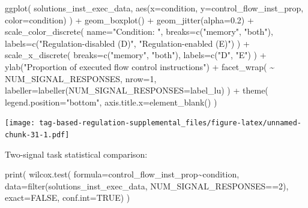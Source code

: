 \documentclass[
]{book}
\newenvironment{Shaded}{\begin{snugshade}}{\end{snugshade}}
\newcommand{\AttributeTok}[1]{\textcolor[rgb]{0.77,0.63,0.00}{#1}}
\newcommand{\ConstantTok}[1]{\textcolor[rgb]{0.00,0.00,0.00}{#1}}
\newcommand{\DecValTok}[1]{\textcolor[rgb]{0.00,0.00,0.81}{#1}}
\newcommand{\FloatTok}[1]{\textcolor[rgb]{0.00,0.00,0.81}{#1}}
\newcommand{\FunctionTok}[1]{\textcolor[rgb]{0.00,0.00,0.00}{#1}}
\newcommand{\NormalTok}[1]{#1}
\newcommand{\SpecialCharTok}[1]{\textcolor[rgb]{0.00,0.00,0.00}{#1}}
\newcommand{\StringTok}[1]{\textcolor[rgb]{0.31,0.60,0.02}{#1}}
\begin{document}
\begin{Shaded}
\begin{Highlighting}[]
\FunctionTok{ggplot}\NormalTok{( solutions\_inst\_exec\_data, }\FunctionTok{aes}\NormalTok{(}\AttributeTok{x=}\NormalTok{condition, }\AttributeTok{y=}\NormalTok{control\_flow\_inst\_prop, }\AttributeTok{color=}\NormalTok{condition) ) }\SpecialCharTok{+}
  \FunctionTok{geom\_boxplot}\NormalTok{() }\SpecialCharTok{+}
  \FunctionTok{geom\_jitter}\NormalTok{(}\AttributeTok{alpha=}\FloatTok{0.2}\NormalTok{) }\SpecialCharTok{+}
  \FunctionTok{scale\_color\_discrete}\NormalTok{(}
    \AttributeTok{name=}\StringTok{"Condition: "}\NormalTok{,}
    \AttributeTok{breaks=}\FunctionTok{c}\NormalTok{(}\StringTok{"memory"}\NormalTok{, }\StringTok{"both"}\NormalTok{),}
    \AttributeTok{labels=}\FunctionTok{c}\NormalTok{(}\StringTok{"Regulation{-}disabled (D)"}\NormalTok{, }\StringTok{"Regulation{-}enabled (E)"}\NormalTok{)}
\NormalTok{  ) }\SpecialCharTok{+}
  \FunctionTok{scale\_x\_discrete}\NormalTok{(}
    \AttributeTok{breaks=}\FunctionTok{c}\NormalTok{(}\StringTok{"memory"}\NormalTok{, }\StringTok{"both"}\NormalTok{),}
    \AttributeTok{labels=}\FunctionTok{c}\NormalTok{(}\StringTok{"D"}\NormalTok{, }\StringTok{"E"}\NormalTok{)}
\NormalTok{  ) }\SpecialCharTok{+}
  \FunctionTok{ylab}\NormalTok{(}\StringTok{"Proportion of executed flow control instructions"}\NormalTok{) }\SpecialCharTok{+}
  \FunctionTok{facet\_wrap}\NormalTok{(}
    \SpecialCharTok{\textasciitilde{}}\NormalTok{ NUM\_SIGNAL\_RESPONSES,}
    \AttributeTok{nrow=}\DecValTok{1}\NormalTok{,}
    \AttributeTok{labeller=}\FunctionTok{labeller}\NormalTok{(}\AttributeTok{NUM\_SIGNAL\_RESPONSES=}\NormalTok{label\_lu)}
\NormalTok{  ) }\SpecialCharTok{+}
  \FunctionTok{theme}\NormalTok{(}
    \AttributeTok{legend.position=}\StringTok{"bottom"}\NormalTok{,}
    \AttributeTok{axis.title.x=}\FunctionTok{element\_blank}\NormalTok{()}
\NormalTok{  )}
\end{Highlighting}
\end{Shaded}

\texttt{[image: tag-based-regulation-supplemental\_files/figure-latex/unnamed-chunk-31-1.pdf]}

Two-signal task statistical comparison:

\begin{Shaded}
\begin{Highlighting}[]
\FunctionTok{print}\NormalTok{(}
  \FunctionTok{wilcox.test}\NormalTok{(}
    \AttributeTok{formula=}\NormalTok{control\_flow\_inst\_prop}\SpecialCharTok{\textasciitilde{}}\NormalTok{condition,}
    \AttributeTok{data=}\FunctionTok{filter}\NormalTok{(solutions\_inst\_exec\_data, NUM\_SIGNAL\_RESPONSES}\SpecialCharTok{==}\DecValTok{2}\NormalTok{),}
    \AttributeTok{exact=}\ConstantTok{FALSE}\NormalTok{,}
    \AttributeTok{conf.int=}\ConstantTok{TRUE}\NormalTok{)}
\NormalTok{)}
\end{Highlighting}
\end{Shaded}
\end{document}
